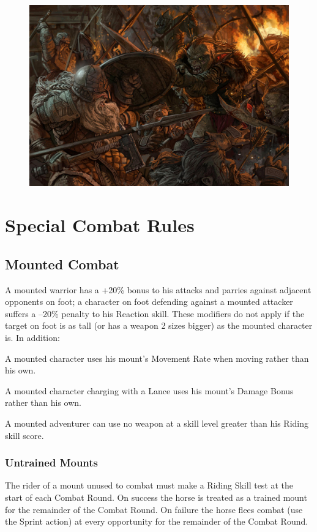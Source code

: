 \begin{figure}
\begin{center}
\includegraphics[scale=0.49]{img/the_last_stand_by_ncorva.jpg}
\end{center}
\end{figure}


\section{Special Combat Rules}

\subsection{Mounted Combat}
A mounted warrior has a +20\% bonus to his attacks and parries against adjacent opponents on foot; a character on foot defending against a mounted attacker suffers a –20\% penalty to his Reaction skill. These modifiers do not apply if the target on foot is as tall (or has a weapon 2 sizes bigger) as the mounted character is. In addition:
\begin{rpg-list}
\item A mounted character uses his mount’s Movement Rate when moving rather than his own.
\item A mounted character charging with a Lance uses his mount’s Damage Bonus rather than his own.
\item A mounted adventurer can use no weapon at a skill level greater than his Riding skill score. 
\end{rpg-list}

\subsubsection{Untrained Mounts}
The rider of a mount unused to combat must make a Riding Skill test at the start of each Combat Round.
On success the horse is treated as a trained mount for the remainder of the Combat Round. 
On failure the horse flees combat (use the Sprint action) at every opportunity for the remainder of the Combat Round. 


